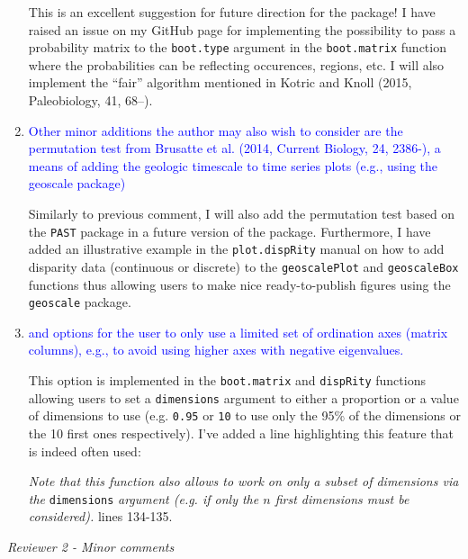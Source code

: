 \documentclass[12pt,letterpaper]{article}
\renewcommand{\subsection}[1]{%
\bigskip
\begin{center}
\begin{large}
\normalfont\itshape #1
\end{large}
\end{center}}
\begin{document}
\begin{enumerate}
This is an excellent suggestion for future direction for the package!
I have raised an issue on my GitHub page for implementing the possibility to pass a probability matrix to the \texttt{boot.type} argument in the \texttt{boot.matrix} function where the probabilities can be reflecting occurences, regions, etc.
I will also implement the ``fair'' algorithm mentioned in Kotric and Knoll (2015, Paleobiology, 41, 68–).

\item{\textcolor{blue}{Other minor additions the author may also wish to consider are the permutation test from Brusatte et al. (2014, Current Biology, 24, 2386-), a means of adding the geologic timescale to time series plots (e.g., using the geoscale package)}}

Similarly to previous comment, I will also add the permutation test based on the \texttt{PAST} package in a future version of the package.
Furthermore, I have added an illustrative example in the \texttt{plot.dispRity} manual on how to add disparity data (continuous or discrete) to the \texttt{geoscalePlot} and \texttt{geoscaleBox} functions thus allowing users to make nice ready-to-publish figures using the \texttt{geoscale} package.

\item{\textcolor{blue}{and options for the user to only use a limited set of ordination axes (matrix columns), e.g., to avoid using higher axes with negative eigenvalues.}}

This option is implemented in the \texttt{boot.matrix} and \texttt{dispRity} functions allowing users to set a \texttt{dimensions} argument to either a proportion or a value of dimensions to use (e.g. \texttt{0.95} or \texttt{10} to use only the 95\% of the dimensions or the 10 first ones respectively). I've added a line highlighting this feature that is indeed often used:

\textit{Note that this function also allows to work on only a subset of dimensions via the} \texttt{dimensions} \textit{argument (e.g. if only the $n$ first dimensions must be considered).} lines 134-135. 

\end{enumerate}

\subsection{Reviewer 2 - Minor comments}
\end{document}
